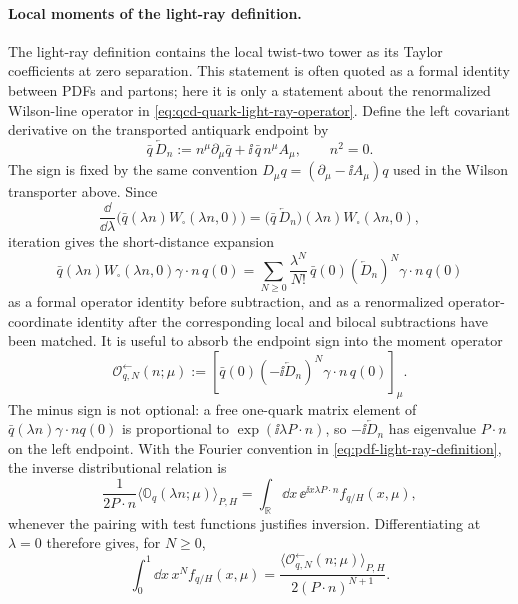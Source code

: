 \paragraph{Local moments of the light-ray definition.}
The light-ray definition contains the local twist-two tower as its Taylor
coefficients at zero separation.  This statement is often quoted as a formal
identity between PDFs and partons; here it is only a statement about the
renormalized Wilson-line operator in
\eqref{eq:qcd-quark-light-ray-operator}.  Define the left covariant
derivative on the transported antiquark endpoint by
\[
  \bar q\,\overleftarrow D_n
  :=
  n^\mu\partial_\mu\bar q+\ii\,\bar q\,n^\mu A_\mu,
  \qquad n^2=0 .
\]
The sign is fixed by the same convention
\(D_\mu q=(\partial_\mu-\ii A_\mu)q\) used in the Wilson transporter above.
Since
\[
  \frac{\dd}{\dd\lambda}
  \bigl(\bar q(\lambda n)W_\square(\lambda n,0)\bigr)
  =
  \bigl(\bar q\,\overleftarrow D_n\bigr)(\lambda n)
  W_\square(\lambda n,0),
\]
iteration gives the short-distance expansion
\begin{equation}
  \bar q(\lambda n)W_\square(\lambda n,0)\gamma\cdot n\,q(0)
  =
  \sum_{N\ge0}\frac{\lambda^N}{N!}\,
  \bar q(0)(\overleftarrow D_n)^N\gamma\cdot n\,q(0)
  \label{eq:qcd-quark-light-ray-taylor-left}
\end{equation}
as a formal operator identity before subtraction, and as a renormalized
operator-coordinate identity after the corresponding local and bilocal
subtractions have been matched.  It is useful to absorb the endpoint sign into
the moment operator
\begin{equation}
  \mathcal O_{q,N}^{\leftarrow}(n;\mu)
  :=
  \left[
    \bar q(0)(-\ii\overleftarrow D_n)^N
    \gamma\cdot n\,q(0)
  \right]_{\mu}.
  \label{eq:qcd-quark-left-moment-operator}
\end{equation}
The minus sign is not optional: a free one-quark matrix element of
\(\bar q(\lambda n)\gamma\cdot n q(0)\) is proportional to
\(\exp(\ii\lambda P\cdot n)\), so \(-\ii\overleftarrow D_n\) has eigenvalue
\(P\cdot n\) on the left endpoint.  With the Fourier convention in
\eqref{eq:pdf-light-ray-definition}, the inverse distributional relation is
\[
  \frac{1}{2P\cdot n}
  \langle\mathbb O_q(\lambda n;\mu)\rangle_{P,H}
  =
  \int_{\mathbb R}\dd x\,
  \ee^{\ii x\lambda P\cdot n}f_{q/H}(x,\mu),
\]
whenever the pairing with test functions justifies inversion.  Differentiating
at \(\lambda=0\) therefore gives, for \(N\ge0\),
\begin{equation}
  \int_0^1\dd x\,x^N f_{q/H}(x,\mu)
  =
  \frac{
    \langle\mathcal O_{q,N}^{\leftarrow}(n;\mu)\rangle_{P,H}
  }{
    2(P\cdot n)^{N+1}
  } .
  \label{eq:qcd-quark-pdf-moment-left-operator}
\end{equation}
